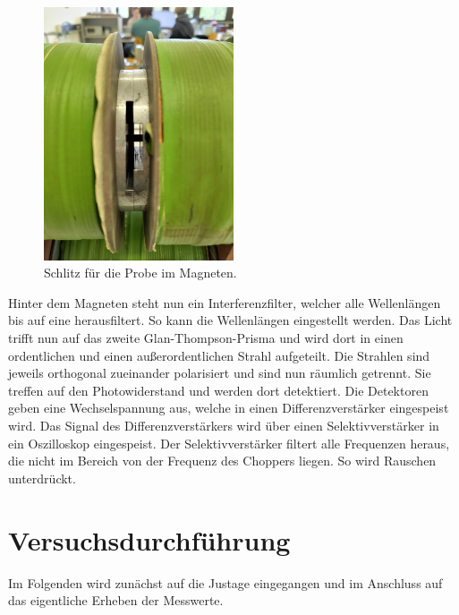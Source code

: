 \begin{figure}[H]
    \includegraphics[width=0.5\textwidth]{Schlitz.jpg}
    \caption{Schlitz für die Probe im Magneten.}
    \label{fig:Schlitz}
\end{figure}

\noindent Hinter dem Magneten steht nun ein Interferenzfilter, welcher alle Wellenlängen bis auf eine herausfiltert. So kann die 
Wellenlängen eingestellt werden. Das Licht trifft nun auf das zweite Glan-Thompson-Prisma und wird dort in einen ordentlichen und einen 
außerordentlichen Strahl aufgeteilt. Die Strahlen sind jeweils orthogonal zueinander polarisiert und sind nun räumlich getrennt. Sie 
treffen auf den Photowiderstand und werden dort detektiert. Die Detektoren geben eine Wechselspannung aus, welche in einen Differenzverstärker 
eingespeist wird. Das Signal des Differenzverstärkers wird über einen Selektivverstärker in ein Oszilloskop eingespeist. Der Selektivverstärker 
filtert alle Frequenzen heraus, die nicht im Bereich von der Frequenz des Choppers liegen. So wird Rauschen unterdrückt. 


\section{Versuchsdurchführung}
\noindent Im Folgenden wird zunächst auf die Justage eingegangen und im Anschluss auf das eigentliche Erheben der Messwerte.

